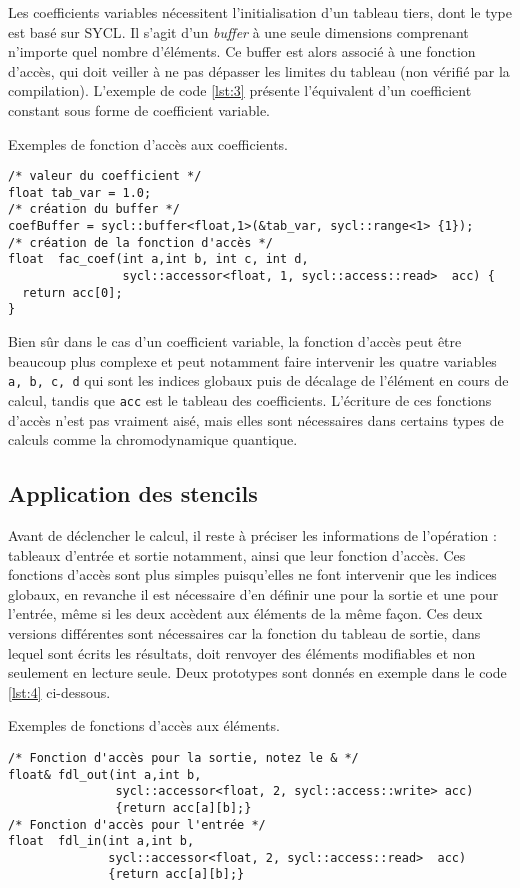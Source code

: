 Les coefficients variables nécessitent l'initialisation d'un tableau tiers, dont le type est basé sur \textsf{SYCL}. Il s'agit d'un \emph{buffer} à une seule dimensions comprenant n'importe quel nombre d'éléments. Ce buffer est alors associé à une fonction d'accès, qui doit veiller à ne pas dépasser les limites du tableau (non vérifié par la compilation). L'exemple de code \ref{lst:3} présente l'équivalent d'un coefficient constant sous forme de coefficient variable.
\begin{listing}[H]
\caption{Exemples de fonction d'accès aux coefficients.}
\label{lst:3}
\begin{verbatim}
/* valeur du coefficient */
float tab_var = 1.0;
/* création du buffer */
coefBuffer = sycl::buffer<float,1>(&tab_var, sycl::range<1> {1});
/* création de la fonction d'accès */
float  fac_coef(int a,int b, int c, int d, 
                sycl::accessor<float, 1, sycl::access::read>  acc) {
  return acc[0];
}
\end{verbatim}
\end{listing}
Bien sûr dans le cas d'un coefficient variable, la fonction d'accès peut être beaucoup plus complexe et peut notamment faire intervenir les quatre variables \verb!a, b, c, d! qui sont les indices globaux puis de décalage de l'élément en cours de calcul, tandis que \verb!acc! est le tableau des coefficients. L'écriture de ces fonctions d'accès n'est pas vraiment aisé, mais elles sont nécessaires dans certains types de calculs comme la chromodynamique quantique.

\subsection{Application des stencils}

Avant de déclencher le calcul, il reste à préciser les informations de l'opération : tableaux d'entrée et sortie notamment, ainsi que leur fonction d'accès. Ces fonctions d'accès sont plus simples puisqu'elles ne font intervenir que les indices globaux, en revanche il est nécessaire d'en définir une pour la sortie et une pour l'entrée, même si les deux accèdent aux éléments de la même façon. Ces deux versions différentes sont nécessaires car la fonction du tableau de sortie, dans lequel sont écrits les résultats, doit renvoyer des éléments modifiables et non seulement en lecture seule. Deux prototypes sont donnés en exemple dans le code \ref{lst:4} ci-dessous.
\begin{listing}[H]
\caption{Exemples de fonctions d'accès aux éléments.}
\label{lst:4}
\begin{verbatim}
/* Fonction d'accès pour la sortie, notez le & */
float& fdl_out(int a,int b, 
               sycl::accessor<float, 2, sycl::access::write> acc) 
               {return acc[a][b];}
/* Fonction d'accès pour l'entrée */
float  fdl_in(int a,int b, 
              sycl::accessor<float, 2, sycl::access::read>  acc) 
              {return acc[a][b];}
\end{verbatim}
\end{listing}

